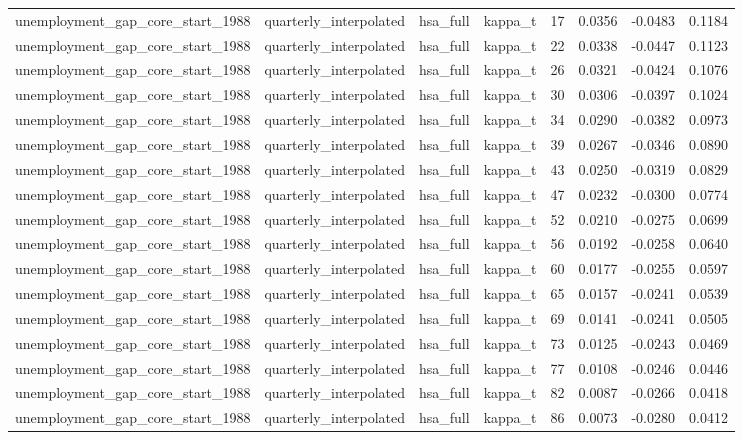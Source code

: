 \begin{tabular}{llllrrrr}
unemployment\_gap\_core\_start\_1988 & quarterly\_interpolated & hsa\_full & kappa\_t & 17 & 0.0356 & -0.0483 & 0.1184 \\
unemployment\_gap\_core\_start\_1988 & quarterly\_interpolated & hsa\_full & kappa\_t & 22 & 0.0338 & -0.0447 & 0.1123 \\
unemployment\_gap\_core\_start\_1988 & quarterly\_interpolated & hsa\_full & kappa\_t & 26 & 0.0321 & -0.0424 & 0.1076 \\
unemployment\_gap\_core\_start\_1988 & quarterly\_interpolated & hsa\_full & kappa\_t & 30 & 0.0306 & -0.0397 & 0.1024 \\
unemployment\_gap\_core\_start\_1988 & quarterly\_interpolated & hsa\_full & kappa\_t & 34 & 0.0290 & -0.0382 & 0.0973 \\
unemployment\_gap\_core\_start\_1988 & quarterly\_interpolated & hsa\_full & kappa\_t & 39 & 0.0267 & -0.0346 & 0.0890 \\
unemployment\_gap\_core\_start\_1988 & quarterly\_interpolated & hsa\_full & kappa\_t & 43 & 0.0250 & -0.0319 & 0.0829 \\
unemployment\_gap\_core\_start\_1988 & quarterly\_interpolated & hsa\_full & kappa\_t & 47 & 0.0232 & -0.0300 & 0.0774 \\
unemployment\_gap\_core\_start\_1988 & quarterly\_interpolated & hsa\_full & kappa\_t & 52 & 0.0210 & -0.0275 & 0.0699 \\
unemployment\_gap\_core\_start\_1988 & quarterly\_interpolated & hsa\_full & kappa\_t & 56 & 0.0192 & -0.0258 & 0.0640 \\
unemployment\_gap\_core\_start\_1988 & quarterly\_interpolated & hsa\_full & kappa\_t & 60 & 0.0177 & -0.0255 & 0.0597 \\
unemployment\_gap\_core\_start\_1988 & quarterly\_interpolated & hsa\_full & kappa\_t & 65 & 0.0157 & -0.0241 & 0.0539 \\
unemployment\_gap\_core\_start\_1988 & quarterly\_interpolated & hsa\_full & kappa\_t & 69 & 0.0141 & -0.0241 & 0.0505 \\
unemployment\_gap\_core\_start\_1988 & quarterly\_interpolated & hsa\_full & kappa\_t & 73 & 0.0125 & -0.0243 & 0.0469 \\
unemployment\_gap\_core\_start\_1988 & quarterly\_interpolated & hsa\_full & kappa\_t & 77 & 0.0108 & -0.0246 & 0.0446 \\
unemployment\_gap\_core\_start\_1988 & quarterly\_interpolated & hsa\_full & kappa\_t & 82 & 0.0087 & -0.0266 & 0.0418 \\
unemployment\_gap\_core\_start\_1988 & quarterly\_interpolated & hsa\_full & kappa\_t & 86 & 0.0073 & -0.0280 & 0.0412 \\

\end{tabular}
